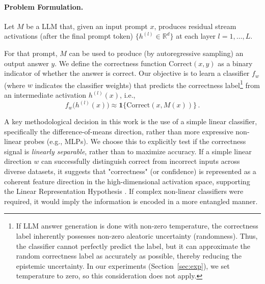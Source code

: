 \documentclass{article} %
\begin{document}
\paragraph{Problem Formulation.} Let \(M\) be a LLM that, given an input prompt $x$, produces residual stream activations (after the final prompt token) \(\{h^{(l)}\in\mathbb{R}^d\}\) at each layer \(l=1,\dots,L\). %

For that prompt, \(M\) can be used to produce (by autoregressive sampling) an output answer \(y\). We define the correctness function \(\text{Correct}(x,y)\) as a binary indicator of whether the answer is correct. Our objective is to learn a classifier \(f_w\) (where \(w\) indicates the classifier weights) that predicts the correctness label\footnote{If LLM answer generation is done with non-zero temperature, the correctness label inherently possesses non-zero aleatoric uncertainty (randomness). Thus, the classifier cannot perfectly predict the label, but it can approximate the random correctness label as accurately as possible, thereby reducing the epistemic uncertainty. In our experiments (Section~\ref{sec:exp}), we set temperature to zero, so this consideration does not apply.} from an intermediate activation \(h^{(l)}(x)\), i.e.,
\[
f_w\bigl(h^{(l)}(x)\bigr) \approx \mathbf{1}\{\text{Correct}(x,M(x))\}\,.
\]

A key methodological decision in this work is the use of a simple linear classifier, specifically the difference-of-means direction, rather than more expressive non-linear probes (e.g., MLPs). We choose this to explicitly test if the correctness signal is \textit{linearly separable}, rather than to maximize accuracy. If a simple linear direction $w$ can successfully distinguish correct from incorrect inputs across diverse datasets, it suggests that "correctness" (or confidence) is represented as a coherent feature direction in the high-dimensional activation space, supporting the Linear Representation Hypothesis \citep{park2024linearrepresentationhypothesisgeometry}. If complex non-linear classifiers were required, it would imply the information is encoded in a more entangled manner.
\end{document}
